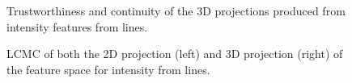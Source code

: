 \begin{figure}[H]
	\centering
	\caption{Trustworthiness and continuity of the 3D projections produced from intensity features from lines.}\label{fig:TC_3d_intensity}
\end{figure}

\begin{figure}[H]
	\centering
	\caption{LCMC of both the 2D projection (left) and 3D projection (right) of the feature space for intensity from lines.}\label{fig:LCMC_intensity}
\end{figure}
\clearpage


